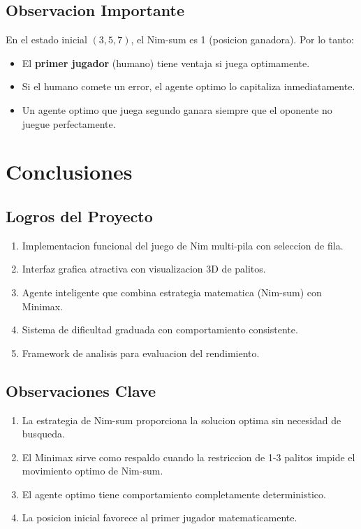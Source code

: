 \documentclass[12pt,a4paper]{article}
\theoremstyle{definition}
\begin{document}
\subsection{Observacion Importante}

En el estado inicial $(3, 5, 7)$, el Nim-sum es 1 (posicion ganadora). Por lo tanto:

\begin{itemize}
    \item El \textbf{primer jugador} (humano) tiene ventaja si juega optimamente.
    \item Si el humano comete un error, el agente optimo lo capitaliza inmediatamente.
    \item Un agente optimo que juega segundo ganara siempre que el oponente no juegue perfectamente.
\end{itemize}

\section{Conclusiones}

\subsection{Logros del Proyecto}

\begin{enumerate}
    \item Implementacion funcional del juego de Nim multi-pila con seleccion de fila.
    \item Interfaz grafica atractiva con visualizacion 3D de palitos.
    \item Agente inteligente que combina estrategia matematica (Nim-sum) con Minimax.
    \item Sistema de dificultad graduada con comportamiento consistente.
    \item Framework de analisis para evaluacion del rendimiento.
\end{enumerate}

\subsection{Observaciones Clave}

\begin{enumerate}
    \item La estrategia de Nim-sum proporciona la solucion optima sin necesidad de busqueda.
    \item El Minimax sirve como respaldo cuando la restriccion de 1-3 palitos impide el movimiento optimo de Nim-sum.
    \item El agente optimo tiene comportamiento completamente deterministico.
    \item La posicion inicial favorece al primer jugador matematicamente.
\end{enumerate}
\end{document}
